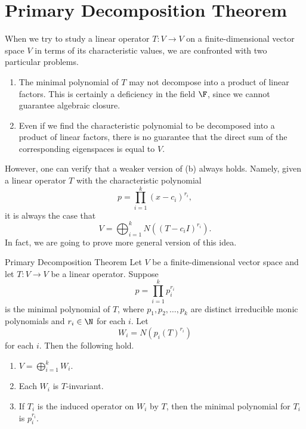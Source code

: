 \documentclass[linearalgebraII]{subfiles}
\begin{document}
    \section{Primary Decomposition Theorem}
    
    \begin{remark}
        When we try to study a linear operator $T:V\to V$ on a finite-dimensional vector space $V$ in terms of its characteristic values, we are confronted with two particular problems.
        \begin{enumerate}
            \item The minimal polynomial of $T$ may not decompose into a product of linear factors. This is certainly a deficiency in the field $\F$, since we cannot guarantee algebraic closure. 
            \item Even if we find the characteristic polynomial to be decomposed into a product of linear factors, there is no guarantee that the direct sum of the corresponding eigenspaces is equal to $V$.
        \end{enumerate}
        However, one can verify that a weaker version of (b) always holds. Namely, given a linear operator $T$ with the characteristic polynomial
        \begin{equation*}
            p = \prod^{k}_{i=1} (x-c_i)^{r_i},
        \end{equation*}
        it is always the case that
        \begin{equation*}
            V = \bigoplus^{k}_{i=1} N \left( \left( T-c_iI \right)^{r_i} \right).
        \end{equation*}
        In fact, we are going to prove more general version of this idea.
    \end{remark}

    \begin{theorem}{Primary Decomposition Theorem}
        Let $V$ be a finite-dimensional vector space and let $T:V\to V$ be a linear operator. Suppose
        \begin{equation*}
            p = \prod^{k}_{i=1} p_i^{r_i}
        \end{equation*}
        is the minimal polynomial of $T$, where $p_1, p_2, \ldots, p_k$ are distinct irreducible monic polynomials and $r_i\in \N$ for each $i$. Let
        \begin{equation*}
            W_i = N \left( p_i(T)^{r_i} \right) 
        \end{equation*}
        for each $i$. Then the following hold.
        \begin{enumerate}
            \item $V = \bigoplus^{k}_{i=1} W_i$.
            \item Each $W_i$ is $T$-invariant.
            \item If $T_i$ is the induced operator on $W_i$ by $T$, then the minimal polynomial for $T_i$ is $p_i^{r_i}$.
        \end{enumerate}
    \end{theorem}
\end{document}
